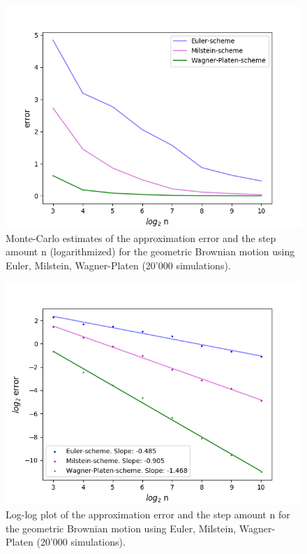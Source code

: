 \begin{figure}[!h]
     \includegraphics[scale=0.7]{Content/Graphics/Appendix/Error_analysis_gbm}
	\caption{Monte-Carlo estimates of the approximation error and the step amount n (logarithmized) for the geometric Brownian motion using Euler, Milstein, Wagner-Platen (20'000 simulations).}
\end{figure}
\begin{figure}[!h]
     \includegraphics[scale=0.7]{Content/Graphics/Appendix/Conv_order_gbm}
\caption{Log-log plot of the approximation error and the step amount n for the geometric Brownian motion using Euler, Milstein, Wagner-Platen (20'000 simulations).} 
\end{figure}
